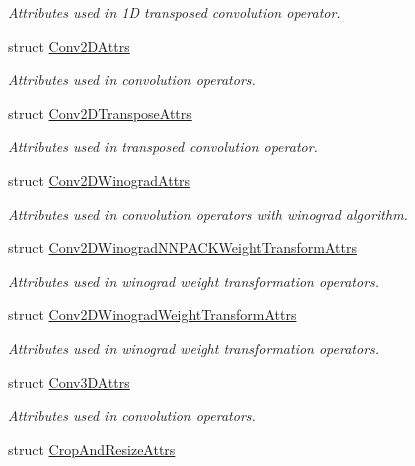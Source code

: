 \begin{DoxyCompactItemize}
\begin{DoxyCompactList}\small\item\em Attributes used in 1D transposed convolution operator. \end{DoxyCompactList}\item 
struct \hyperlink{structtvm_1_1relay_1_1Conv2DAttrs}{Conv2\+D\+Attrs}
\begin{DoxyCompactList}\small\item\em Attributes used in convolution operators. \end{DoxyCompactList}\item 
struct \hyperlink{structtvm_1_1relay_1_1Conv2DTransposeAttrs}{Conv2\+D\+Transpose\+Attrs}
\begin{DoxyCompactList}\small\item\em Attributes used in transposed convolution operator. \end{DoxyCompactList}\item 
struct \hyperlink{structtvm_1_1relay_1_1Conv2DWinogradAttrs}{Conv2\+D\+Winograd\+Attrs}
\begin{DoxyCompactList}\small\item\em Attributes used in convolution operators with winograd algorithm. \end{DoxyCompactList}\item 
struct \hyperlink{structtvm_1_1relay_1_1Conv2DWinogradNNPACKWeightTransformAttrs}{Conv2\+D\+Winograd\+N\+N\+P\+A\+C\+K\+Weight\+Transform\+Attrs}
\begin{DoxyCompactList}\small\item\em Attributes used in winograd weight transformation operators. \end{DoxyCompactList}\item 
struct \hyperlink{structtvm_1_1relay_1_1Conv2DWinogradWeightTransformAttrs}{Conv2\+D\+Winograd\+Weight\+Transform\+Attrs}
\begin{DoxyCompactList}\small\item\em Attributes used in winograd weight transformation operators. \end{DoxyCompactList}\item 
struct \hyperlink{structtvm_1_1relay_1_1Conv3DAttrs}{Conv3\+D\+Attrs}
\begin{DoxyCompactList}\small\item\em Attributes used in convolution operators. \end{DoxyCompactList}\item 
struct \hyperlink{structtvm_1_1relay_1_1CropAndResizeAttrs}{Crop\+And\+Resize\+Attrs}

\end{DoxyCompactItemize}
